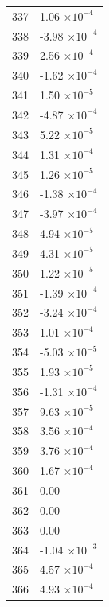 \documentclass[a4paper,11pt]{article}
\begin{document}
\begin{center}
\begin{longtable}{|R{1.5cm}|R{2.5cm}|}
  337 &         1.06 $\times 10^{          -4}$ \\
  338 &        -3.98 $\times 10^{          -4}$ \\
  339 &         2.56 $\times 10^{          -4}$ \\
  340 &        -1.62 $\times 10^{          -4}$ \\
  341 &         1.50 $\times 10^{          -5}$ \\
  342 &        -4.87 $\times 10^{          -4}$ \\
  343 &         5.22 $\times 10^{          -5}$ \\
  344 &         1.31 $\times 10^{          -4}$ \\
  345 &         1.26 $\times 10^{          -5}$ \\
  346 &        -1.38 $\times 10^{          -4}$ \\
  347 &        -3.97 $\times 10^{          -4}$ \\
  348 &         4.94 $\times 10^{          -5}$ \\
  349 &         4.31 $\times 10^{          -5}$ \\
  350 &         1.22 $\times 10^{          -5}$ \\
  351 &        -1.39 $\times 10^{          -4}$ \\
  352 &        -3.24 $\times 10^{          -4}$ \\
  353 &         1.01 $\times 10^{          -4}$ \\
  354 &        -5.03 $\times 10^{          -5}$ \\
  355 &         1.93 $\times 10^{          -5}$ \\
  356 &        -1.31 $\times 10^{          -4}$ \\
  357 &         9.63 $\times 10^{          -5}$ \\
  358 &         3.56 $\times 10^{          -4}$ \\
  359 &         3.76 $\times 10^{          -4}$ \\
  360 &         1.67 $\times 10^{          -4}$ \\
  361 &         0.00 \\
  362 &         0.00 \\
  363 &         0.00 \\
  364 &        -1.04 $\times 10^{          -3}$ \\
  365 &         4.57 $\times 10^{          -4}$ \\
  366 &         4.93 $\times 10^{          -4}$ \\

\end{longtable}
\end{center}
\end{document}
